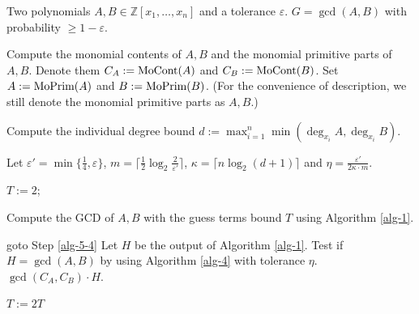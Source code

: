 \documentclass[final,20pt]{elsarticle}
\def\Z{{\mathbb Z}}
\def\MoCont{\hbox{\rm{MoCont}}}
\def\MoPrim{\hbox{\rm{MoPrim}}}
\begin{document}
\begin{algorithm}[H]
\caption{GCD algorithm for $\Z[x_1,\dots,x_n]$.}\label{alg-5}
\begin{algorithmic}[1]
\REQUIRE Two polynomials $A,B\in \Z[x_1,\dots,x_n]$ and a tolerance $\varepsilon$.
\ENSURE $G=\gcd(A,B)$ with probability $\geq 1-\varepsilon$.


\STATE Compute the monomial contents of $A,B$ and the monomial primitive parts of $A,B$. Denote them $C_A:=\MoCont(A)$ and $C_B:=\MoCont(B)$.  Set $A:=\MoPrim(A)$ and $B:=\MoPrim(B)$. (For the convenience of description, we still denote the monomial primitive parts as $A,B$.)\label{alg-5-1}

\STATE Compute the individual degree bound $d:=\max_{i=1}^n \min(\deg_{x_i}A,\deg_{x_i}B)$.

\STATE Let $\varepsilon'=\min\{\frac14,\varepsilon\}$, $m=\lceil\frac{1}{2}\log_2 \frac{2}{\varepsilon'} \rceil$, $\kappa=\lceil n\log_2(d+1)\rceil$ and $\eta=\frac{\varepsilon'}{2\kappa\cdot m}.$\

\STATE $T:=2$;
\REPEAT \label{alg-5-3}


\STATE Compute the GCD of $A,B$ with the guess terms bound $T$ using Algorithm \ref{alg-1}.\label{alg-5-6}

 \STATE goto Step \ref{alg-5-4}
 \ELSE
 \STATE Let $H$ be the output of Algorithm \ref{alg-1}.
 \ENDIF
%
\STATE Test if $H=\gcd(A,B)$ by using Algorithm \ref{alg-4} with tolerance $\eta$.\label{alg-5-12}
\RETURN $\gcd(C_A,C_B) \cdot H$.\label{alg-5-13}
\ENDIF
\ENDFOR

\STATE $T:=2T$
\ENDIF
\UNTIL \label{alg-5-16}

\end{algorithmic}
\end{algorithm}
\end{document}
